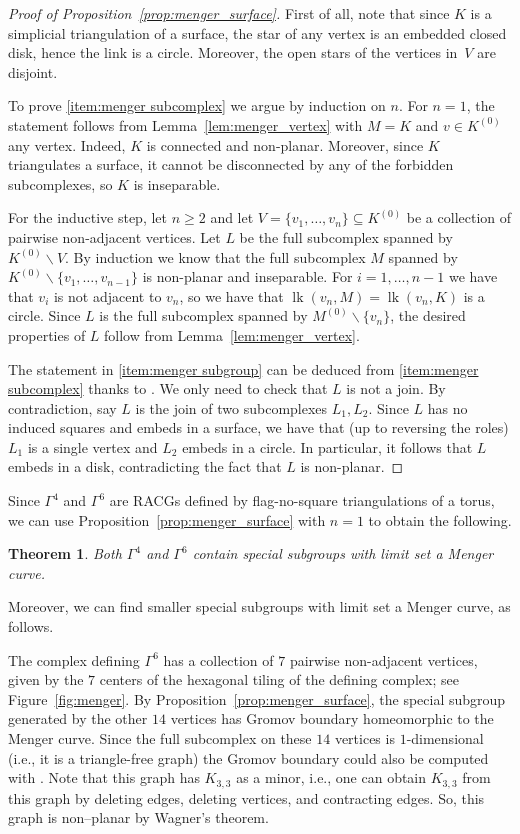 \documentclass{amsart}
\theoremstyle{plain}
\newtheorem{theorem}{Theorem}[section]
\theoremstyle{definition}
\theoremstyle{remark}
\numberwithin{equation}{section}
\newcommand{\lk}[2]{\operatorname{lk}(#1,#2)} %
\renewcommand{\geq}{\geqslant}
\renewcommand{\setminus}{\smallsetminus}
\begin{document}
\begin{proof}[Proof of Proposition~\ref{prop:menger_surface}]
First of all, note that since $K$ is a simplicial triangulation of a surface, the star of any vertex is an embedded closed disk, hence the link is a circle.
Moreover, the open stars of the vertices in~$V$ are disjoint.

To prove \eqref{item:menger subcomplex} we argue by induction on $n$.
For $n=1$, the statement follows from Lemma~\ref{lem:menger_vertex} with $M = K$ and $v\in K^{(0)}$ any vertex.
Indeed,  $K$ is connected and non-planar.
Moreover, since $K$ triangulates a surface, it cannot be disconnected by any of the forbidden subcomplexes, so $K$ is inseparable.

For the inductive step, let $n\geq 2$ and let $V=\{v_1,\dots,v_n\}\subseteq K^{(0)}$ be a collection of pairwise non-adjacent vertices.
Let $L$ be the full subcomplex  spanned by $K^{(0)}\setminus V$.
By induction we know that the full subcomplex $M$ spanned by $K^{(0)} \setminus \{v_1,\dots,v_{n-1}\}$ is non-planar and inseparable.
For $i=1,\dots, n-1$ we have that $v_i$ is not adjacent to $v_n$, so  we have that 
$\lk {v_n}{M}=\lk {v_n}{K}$ is a circle.
 Since $L$ is the full subcomplex spanned by $M^{(0)}\setminus \{v_n\}$, the desired properties of $L$ follow from Lemma~\ref{lem:menger_vertex}.

The statement in \eqref{item:menger subgroup} can be deduced  from \eqref{item:menger subcomplex} thanks to  \cite[Theorem 0.1.(2)]{DS21}. We only need to check that  $L$ is not a join.
By contradiction, say $L$ is the join of two subcomplexes $L_1,L_2$. 
Since $L$ has no induced squares and embeds in a surface, we have that (up to reversing the roles) $L_1$ is a single vertex and $L_2$ embeds in a circle. In particular, it follows that $L$ embeds in a disk, contradicting the fact that $L$ is non-planar.
\end{proof}

Since $\Gamma^4$ and $\Gamma^6$ are RACGs defined by flag-no-square triangulations of a torus, we can use Proposition~\ref{prop:menger_surface} with $n=1$ to obtain the following.
\begin{theorem}\label{thm:menger}
    Both $\Gamma^4$ and $\Gamma^6$ contain special subgroups with limit set a Menger curve.
\end{theorem}

Moreover, we can find smaller special subgroups with limit set a Menger curve, as follows.

The complex defining  $\Gamma^6$ 
has a collection of $7$ pairwise non-adjacent vertices,  given by the  $7$  centers of the hexagonal tiling of the defining complex; see Figure~\ref{fig:menger}. 
By Proposition~\ref{prop:menger_surface}, the special subgroup generated by the other $14$ vertices has Gromov boundary homeomorphic to the Menger curve.
Since the full subcomplex on these $14$ vertices is $1$-dimensional (i.e., it is a triangle-free graph) the Gromov boundary could also be computed with  \cite[Corollary 1.7]{DHW23}. 
Note that this graph has  $K_{3,3}$ as a minor, i.e., one can obtain $K_{3,3}$ from this graph by deleting edges, deleting vertices, and  contracting edges. So, this graph is non--planar by Wagner's theorem.
\end{document}
